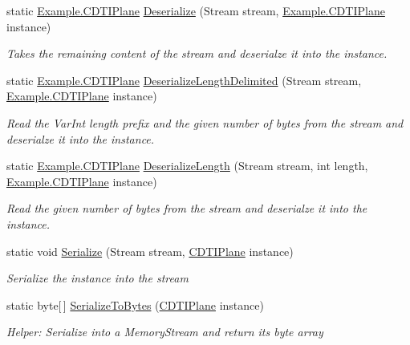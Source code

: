 \begin{DoxyCompactItemize}
static \hyperlink{class_example_1_1_c_d_t_i_plane}{Example.\+C\+D\+T\+I\+Plane} \hyperlink{class_example_1_1_c_d_t_i_plane_ad4231bb21fad192ec5235136c7efc2f3}{Deserialize} (Stream stream, \hyperlink{class_example_1_1_c_d_t_i_plane}{Example.\+C\+D\+T\+I\+Plane} instance)
\begin{DoxyCompactList}\small\item\em Takes the remaining content of the stream and deserialze it into the instance.\end{DoxyCompactList}\item 
static \hyperlink{class_example_1_1_c_d_t_i_plane}{Example.\+C\+D\+T\+I\+Plane} \hyperlink{class_example_1_1_c_d_t_i_plane_ae2f44dc0c44f735cb4d8cc977d5a8e01}{Deserialize\+Length\+Delimited} (Stream stream, \hyperlink{class_example_1_1_c_d_t_i_plane}{Example.\+C\+D\+T\+I\+Plane} instance)
\begin{DoxyCompactList}\small\item\em Read the Var\+Int length prefix and the given number of bytes from the stream and deserialze it into the instance.\end{DoxyCompactList}\item 
static \hyperlink{class_example_1_1_c_d_t_i_plane}{Example.\+C\+D\+T\+I\+Plane} \hyperlink{class_example_1_1_c_d_t_i_plane_a0a9d43348ee794a421d41c1fe66865db}{Deserialize\+Length} (Stream stream, int length, \hyperlink{class_example_1_1_c_d_t_i_plane}{Example.\+C\+D\+T\+I\+Plane} instance)
\begin{DoxyCompactList}\small\item\em Read the given number of bytes from the stream and deserialze it into the instance.\end{DoxyCompactList}\item 
static void \hyperlink{class_example_1_1_c_d_t_i_plane_a56aa1ceb3a4ad073c405dd9fad2bdc57}{Serialize} (Stream stream, \hyperlink{class_example_1_1_c_d_t_i_plane}{C\+D\+T\+I\+Plane} instance)
\begin{DoxyCompactList}\small\item\em Serialize the instance into the stream\end{DoxyCompactList}\item 
static byte\mbox{[}$\,$\mbox{]} \hyperlink{class_example_1_1_c_d_t_i_plane_a6de7c84b310e228f607f6dc5ed9ed3e3}{Serialize\+To\+Bytes} (\hyperlink{class_example_1_1_c_d_t_i_plane}{C\+D\+T\+I\+Plane} instance)
\begin{DoxyCompactList}\small\item\em Helper\+: Serialize into a Memory\+Stream and return its byte array\end{DoxyCompactList}\item 

\end{DoxyCompactItemize}
